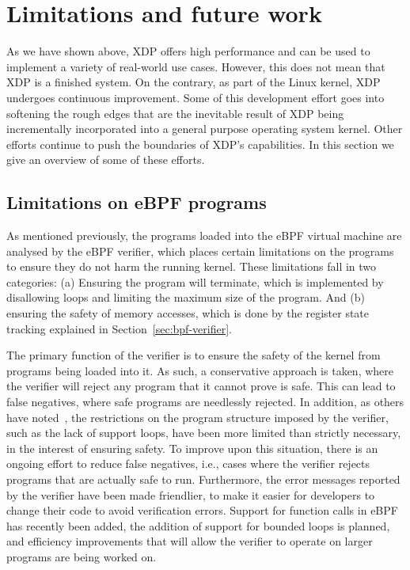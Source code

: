 \documentclass[sigconf]{acmart}
\begin{document}
\section{Limitations and future work}
\label{sec:limitations}
As we have shown above, XDP offers high performance and can be used to implement
a variety of real-world use cases. However, this does not mean that XDP is a
finished system. On the contrary, as part of the Linux kernel, XDP undergoes
continuous improvement. Some of this development effort goes into softening the
rough edges that are the inevitable result of XDP being incrementally
incorporated into a general purpose operating system kernel. Other efforts
continue to push the boundaries of XDP's capabilities. In this section we give
an overview of some of these efforts.

\subsection{Limitations on eBPF programs}
\label{sec:limit-ebpf-progr}

As mentioned previously, the programs loaded into the eBPF virtual machine are
analysed by the eBPF verifier, which places certain limitations on the programs
to ensure they do not harm the running kernel. These limitations fall in two
categories: (a) Ensuring the program will terminate, which is implemented by
disallowing loops and limiting the maximum size of the program. And (b) ensuring
the safety of memory accesses, which is done by the register state tracking
explained in Section~\ref{sec:bpf-verifier}.

The primary function of the verifier is to ensure the safety of the kernel from
programs being loaded into it. As such, a conservative approach is taken, where
the verifier will reject any program that it cannot prove is safe. This can lead
to false negatives, where safe programs are needlessly rejected. In addition, as
others have noted~\cite{miano2018creating}, the restrictions on the program
structure imposed by the verifier, such as the lack of support loops, have been
more limited than strictly necessary, in the interest of ensuring safety. To
improve upon this situation, there is an ongoing effort to reduce false
negatives, i.e., cases where the verifier rejects programs that are actually
safe to run. Furthermore, the error messages reported by the verifier have been
made friendlier, to make it easier for developers to change their code to avoid
verification errors. Support for function calls in eBPF has recently been added,
the addition of support for bounded loops is planned, and efficiency
improvements that will allow the verifier to operate on larger programs are
being worked on.
\end{document}
